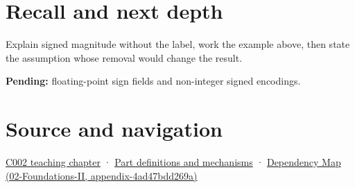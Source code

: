 \section{Recall and next depth}\label{appendix-ce20506c8532-recall-and-next-depth}

Explain signed magnitude without the label, work the example above, then state the assumption whose removal would change the result.

\textbf{Pending:} floating-point sign fields and non-integer signed encodings.

\section{Source and navigation}\label{appendix-ce20506c8532-source-and-navigation}

\href{Continuous\%20Notes/Computing\%20Foundations\%20-\%20From\%20Bits\%20to\%20C++\%20and\%20Systems\%20APIs\#Arithmetic\%20becomes\%20a\%20policy}{C002 teaching chapter} · \hyperref[appendix-fd090d982a15]{Part definitions and mechanisms} · \href{../02-Foundations-II/main.pdf\#nameddest=appendix-4ad47bdd269a}{Dependency Map (02-Foundations-II, appendix-4ad47bdd269a)}
